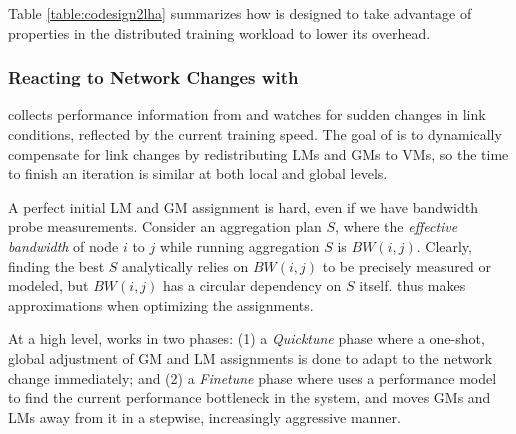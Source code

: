 Table \ref{table:codesign2lha} summarizes how \ha is designed to take advantage of properties in the distributed training workload to lower its overhead.

\subsubsection{Reacting to Network Changes with \autoplink}
\label{sec:autoplinkimpl}
\autoplink collects performance information from \ha and watches for sudden changes in link conditions, reflected by the current training speed. %
The goal of \autoplink is to dynamically compensate for link changes by redistributing LMs and GMs to VMs, so the time to finish an iteration is similar at both local and global levels.  %

A perfect initial LM and GM assignment is hard, even if we have bandwidth probe measurements. Consider an aggregation plan $S$, where the \textit{effective bandwidth} of node $i$ to $j$ while running aggregation $S$ is $BW(i,j)$.  Clearly, finding the best $S$ analytically relies on $BW(i,j)$ to be precisely measured or modeled, but $BW(i,j)$ has a circular dependency on $S$ itself. \autoplink thus makes approximations when optimizing the assignments. %

At a high level, \autoplink works in two phases: (1) a \textit{Quicktune} phase where a one-shot, global adjustment of GM and LM assignments is done to adapt to the network change immediately; and (2) a \textit{Finetune} phase where \autoplink uses a performance model to find the current performance bottleneck in the system, and moves GMs and LMs away from it in a stepwise, increasingly aggressive manner.

